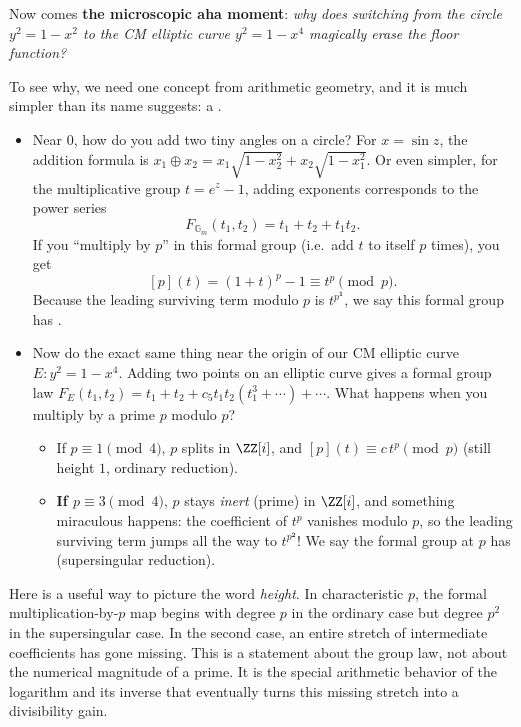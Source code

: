 Now comes \textbf{the microscopic aha moment}: \emph{why does switching from the circle \(y^2 = 1-x^2\) to the CM elliptic curve \(y^2 = 1-x^4\) magically erase the floor function?}

To see why, we need one concept from arithmetic geometry, and it is much simpler than its name suggests: a .
\begin{itemize}
  \item Near \(0\), how do you add two tiny angles on a circle? For \(x = \sin z\), the addition formula is \(x_1 \oplus x_2 = x_1\sqrt{1-x_2^2} + x_2\sqrt{1-x_1^2}\). Or even simpler, for the multiplicative group \(t = e^z - 1\), adding exponents corresponds to the power series
  \[
    F_{\mathbb{G}_m}(t_1, t_2) = t_1 + t_2 + t_1 t_2.
  \]
  If you ``multiply by \(p\)'' in this formal group (i.e.\ add \(t\) to itself \(p\) times), you get
  \[
    [p](t) = (1+t)^p - 1 \equiv t^p \pmod{p}.
  \]
  Because the leading surviving term modulo \(p\) is \(t^{p^{\mathbf{1}}}\), we say this formal group has .
  \item Now do the exact same thing near the origin of our CM elliptic curve \(E: y^2 = 1-x^4\). Adding two points on an elliptic curve gives a formal group law \(F_E(t_1, t_2) = t_1 + t_2 + c_5 t_1 t_2(t_1^3+\cdots) + \cdots\). What happens when you multiply by a prime \(p\) modulo \(p\)?
  \begin{itemize}
    \item If \(p \equiv 1 \pmod 4\), \(p\) splits in \(\ZZ[i]\), and \([p](t) \equiv c\, t^p \pmod p\) (still height \(1\), ordinary reduction).
    \item \textbf{If \(p \equiv 3 \pmod 4\)}, \(p\) stays \emph{inert} (prime) in \(\ZZ[i]\), and something miraculous happens: the coefficient of \(t^p\) vanishes modulo \(p\), so the leading surviving term jumps all the way to \(t^{p^{\mathbf{2}}}\)! We say the formal group at \(p\) has  (supersingular reduction).
  \end{itemize}
\end{itemize}

Here is a useful way to picture the word \emph{height}. In characteristic \(p\), the formal multiplication-by-\(p\) map begins with degree \(p\) in the ordinary case but degree \(p^2\) in the supersingular case. In the second case, an entire stretch of intermediate coefficients has gone missing. This is a statement about the group law, not about the numerical magnitude of a prime. It is the special arithmetic behavior of the logarithm and its inverse that eventually turns this missing stretch into a divisibility gain.

